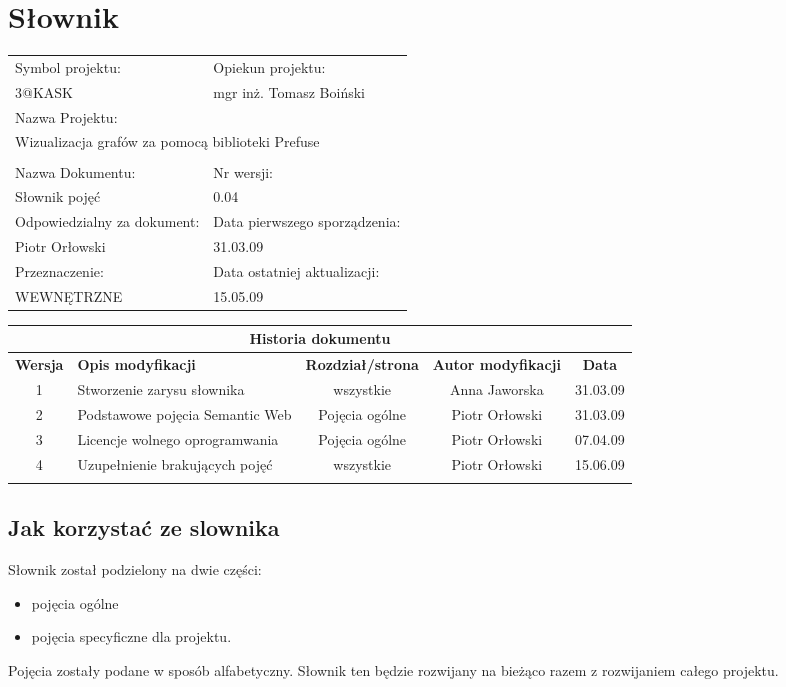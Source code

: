 

\section{Słownik}



\begin{center}
\begin{tabular}{|p{7cm}|p{7cm}|}
\hline
Symbol projektu: & Opiekun projektu:   \tabularnewline
3@KASK & mgr inż. Tomasz Boiński    \tabularnewline \hline
\multicolumn{2}{|l|}{Nazwa Projektu: } \tabularnewline
\multicolumn{2}{|l|}{Wizualizacja grafów za pomocą biblioteki Prefuse } \tabularnewline
\hline
\multicolumn{2}{l}{ } \tabularnewline %
\hline
Nazwa Dokumentu: & Nr wersji:   \tabularnewline
Słownik pojęć & 0.04 \tabularnewline \hline
Odpowiedzialny za dokument: & Data pierwszego sporządzenia:   \tabularnewline
Piotr Orłowski & 31.03.09 \tabularnewline \hline
Przeznaczenie: & Data ostatniej aktualizacji:   \tabularnewline
WEWNĘTRZNE & 15.05.09 \tabularnewline \hline
\end{tabular}
\end{center}

\begin{center}
\begin{tabular}{|c|p{4cm}|c|c|c|}
\multicolumn{5}{c}{\textbf{Historia dokumentu}} \tabularnewline \hline
\textbf{Wersja} & \textbf{Opis modyfikacji} & \textbf{Rozdział/strona} & \textbf{Autor modyfikacji} & \textbf{Data} \tabularnewline \hline
1 & Stworzenie zarysu słownika & wszystkie & Anna Jaworska & 31.03.09 \tabularnewline \hline
2 & Podstawowe pojęcia Semantic Web & Pojęcia ogólne & Piotr Orłowski & 31.03.09 \tabularnewline \hline
3 & Licencje wolnego oprogramwania & Pojęcia ogólne & Piotr Orłowski & 07.04.09 \tabularnewline \hline
4 & Uzupełnienie brakujących pojęć & wszystkie & Piotr Orłowski & 15.06.09 \tabularnewline \hline
& & & &\tabularnewline \hline
\end{tabular}
\end{center}

\newpage

\subsection{Jak korzystać ze slownika}
Słownik został podzielony na dwie części:
\begin{itemize}
 \item pojęcia ogólne
 \item pojęcia specyficzne dla projektu.
\end{itemize}
Pojęcia zostały podane w sposób alfabetyczny. Słownik ten będzie rozwijany na bieżąco razem z rozwijaniem całego projektu.


